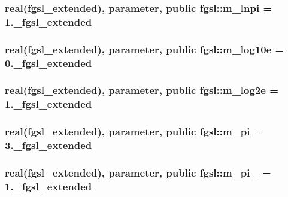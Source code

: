 \subsubsection[{m\+\_\+lnpi}]{\setlength{\rightskip}{0pt plus 5cm}real({\bf fgsl\+\_\+extended}), parameter, public fgsl\+::m\+\_\+lnpi = 1.\+\_\+fgsl\+\_\+extended}\label{namespacefgsl_ae9aff58d6fcadaab60410424796cd713}
\hypertarget{namespacefgsl_a64dfb3018d641c61312823bf56c85023}{}
\subsubsection[{m\+\_\+log10e}]{\setlength{\rightskip}{0pt plus 5cm}real({\bf fgsl\+\_\+extended}), parameter, public fgsl\+::m\+\_\+log10e = 0.\+\_\+fgsl\+\_\+extended}\label{namespacefgsl_a64dfb3018d641c61312823bf56c85023}
\hypertarget{namespacefgsl_a93d2e5a473874e31cbcf8de12963fd8e}{}
\subsubsection[{m\+\_\+log2e}]{\setlength{\rightskip}{0pt plus 5cm}real({\bf fgsl\+\_\+extended}), parameter, public fgsl\+::m\+\_\+log2e = 1.\+\_\+fgsl\+\_\+extended}\label{namespacefgsl_a93d2e5a473874e31cbcf8de12963fd8e}
\hypertarget{namespacefgsl_a8af1e390793c77a120b600e4844495dc}{}
\subsubsection[{m\+\_\+pi}]{\setlength{\rightskip}{0pt plus 5cm}real({\bf fgsl\+\_\+extended}), parameter, public fgsl\+::m\+\_\+pi = 3.\+\_\+fgsl\+\_\+extended}\label{namespacefgsl_a8af1e390793c77a120b600e4844495dc}
\hypertarget{namespacefgsl_af8cd74655823aa30933d33b51ac35bbc}{}
\subsubsection[{m\+\_\+pi\+\_\+2}]{\setlength{\rightskip}{0pt plus 5cm}real({\bf fgsl\+\_\+extended}), parameter, public fgsl\+::m\+\_\+pi\+\_ = 1.\+\_\+fgsl\+\_\+extended}\label{namespacefgsl_af8cd74655823aa30933d33b51ac35bbc}
\hypertarget{namespacefgsl_ac72cdbd05abd60541bd253d571673cf4}{}
